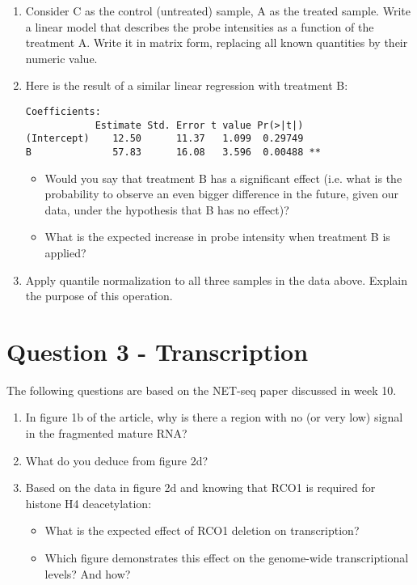 \documentclass[a4paper,11pt]{article}
\begin{document}
\begin{enumerate}
\item Consider C as the control (untreated) sample, A as the treated sample.
  Write a linear model that describes the probe intensities as a
  function of the treatment A.  
  Write it in matrix form, replacing all known
  quantities by their numeric value.
\item Here is the result of a similar linear regression with treatment B: \\
	
\begin{minipage}{\linewidth}
\begin{verbatim}
Coefficients:
            Estimate Std. Error t value Pr(>|t|)
(Intercept)    12.50      11.37   1.099  0.29749
B              57.83      16.08   3.596  0.00488 **
\end{verbatim}
\end{minipage}
	
	\begin{itemize}
	\item Would you say that treatment B has a significant effect 
	  (i.e. what is the probability to observe an even
          bigger difference in the future, given our data,
	  under the hypothesis that B has no effect)?
	\item What is the expected increase in probe intensity when
          treatment B is applied? 
	\end{itemize}
		
\item Apply quantile normalization to all three samples in the data
  above. Explain the purpose of this operation.

\end{enumerate}

\section*{Question 3 - Transcription}

\noindent The following questions are based on the NET-seq paper discussed in week 10.

\begin{enumerate}
\item In figure 1b of the article, why is there a region with no (or
  very low) signal in the fragmented mature RNA? 
\item What do you deduce from figure 2d?
\item Based on the data in figure 2d and knowing that RCO1 is
  required for histone H4 deacetylation:
	\begin{itemize}
	\item What is the expected effect of RCO1 deletion on transcription?
	\item Which figure demonstrates this effect on the genome-wide transcriptional levels? And how?
	\end{itemize}
\end{enumerate}
\end{document}
